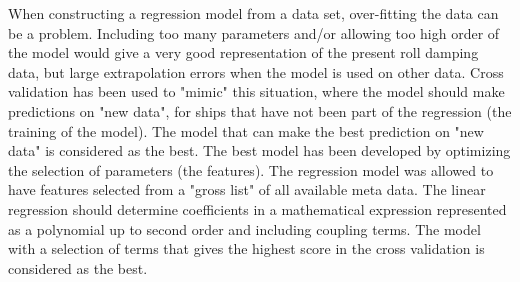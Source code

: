 When constructing a regression model from a data set, over-fitting the data can be a problem. Including too many parameters and/or allowing too high order of the model would give a very good representation of the present roll damping data, but large extrapolation errors when the model is used on other data. Cross validation has been used to "mimic" this situation, where the model should make predictions on "new data", for ships that have not been part of the regression (the training of the model). The model that can make the best prediction on "new data" is considered as the best. The best model has been developed by optimizing the selection of parameters (the features). The regression model was allowed to have features selected from a "gross list" of all available meta data. The linear regression should determine coefficients in a mathematical expression represented as a polynomial up to second order and including coupling terms. The model with a selection of terms that gives the highest score in the cross validation is considered as the best.    
